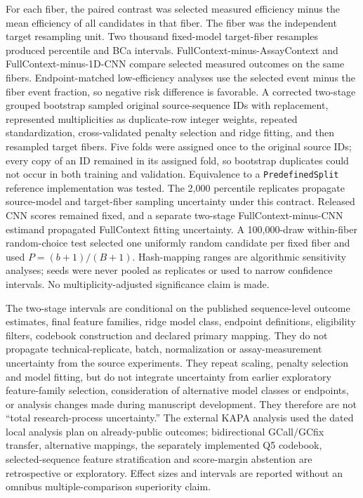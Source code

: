 \documentclass[10pt]{article}
\begin{document}
For each fiber, the paired contrast was selected measured efficiency minus the mean efficiency of all candidates in that fiber. The fiber was the independent target resampling unit. Two thousand fixed-model target-fiber resamples produced percentile and BCa intervals. FullContext-minus-AssayContext and FullContext-minus-1D-CNN compare selected measured outcomes on the same fibers. Endpoint-matched low-efficiency analyses use the selected event minus the fiber event fraction, so negative risk difference is favorable. A corrected two-stage grouped bootstrap sampled original source-sequence IDs with replacement, represented multiplicities as duplicate-row integer weights, repeated standardization, cross-validated penalty selection and ridge fitting, and then resampled target fibers. Five folds were assigned once to the original source IDs; every copy of an ID remained in its assigned fold, so bootstrap duplicates could not occur in both training and validation. Equivalence to a \texttt{PredefinedSplit} reference implementation was tested. The 2,000 percentile replicates propagate source-model and target-fiber sampling uncertainty under this contract. Released CNN scores remained fixed, and a separate two-stage FullContext-minus-CNN estimand propagated FullContext fitting uncertainty. A 100,000-draw within-fiber random-choice test selected one uniformly random candidate per fixed fiber and used $P=(b+1)/(B+1)$. Hash-mapping ranges are algorithmic sensitivity analyses; seeds were never pooled as replicates or used to narrow confidence intervals. No multiplicity-adjusted significance claim is made.

The two-stage intervals are conditional on the published sequence-level outcome estimates, final feature families, ridge model class, endpoint definitions, eligibility filters, codebook construction and declared primary mapping. They do not propagate technical-replicate, batch, normalization or assay-measurement uncertainty from the source experiments. They repeat scaling, penalty selection and model fitting, but do not integrate uncertainty from earlier exploratory feature-family selection, consideration of alternative model classes or endpoints, or analysis changes made during manuscript development. They therefore are not ``total research-process uncertainty.'' The external KAPA analysis used the dated local analysis plan on already-public outcomes; bidirectional GCall/GCfix transfer, alternative mappings, the separately implemented Q5 codebook, selected-sequence feature stratification and score-margin abstention are retrospective or exploratory. Effect sizes and intervals are reported without an omnibus multiple-comparison superiority claim.
\end{document}
